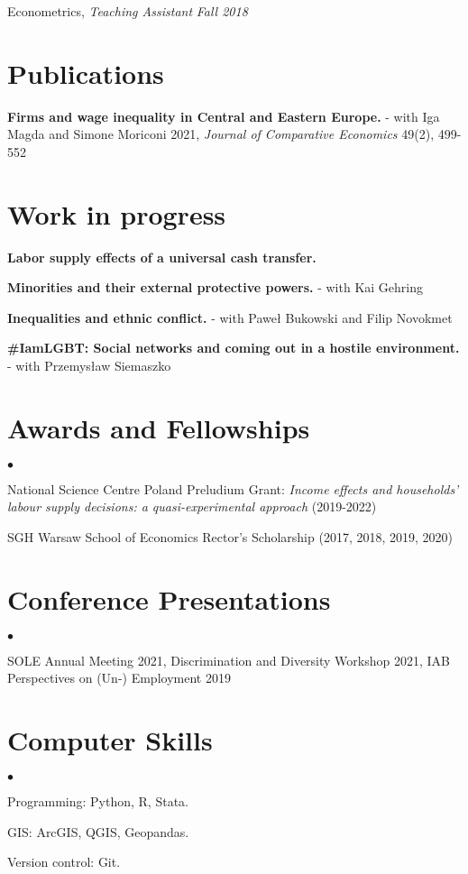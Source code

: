 \documentclass[margin,line]{res}
\newenvironment{list2}{
  \begin{list}{$\bullet$}{%
      \setlength{\itemsep}{0in}
      \setlength{\parsep}{0in} \setlength{\parskip}{0in}
      \setlength{\topsep}{0in} \setlength{\partopsep}{0in} 
      \setlength{\leftmargin}{0.2in}}}{\end{list}}
\begin{document}
\begin{resume}
\vspace{-.3cm}
Econometrics, \textit{Teaching Assistant} \hfill \textit{Fall 2018}\\
\vspace*{.05in}  

\section{\sc Publications}
\textbf{Firms and wage inequality in Central and Eastern Europe.} - with Iga Magda and Simone Moriconi 2021, \textit{Journal of Comparative Economics} 49(2), 499-552
\vspace*{.05in}  
\section{\sc Work in progress}

\textbf{Labor supply effects of a universal cash transfer. }

\textbf{Minorities and their external protective powers. } - with Kai Gehring

\textbf{Inequalities and ethnic conflict.} - with Paweł Bukowski and Filip Novokmet

\textbf{\#IamLGBT: Social networks and coming out in a hostile environment.} - with Przemysław Siemaszko
\vspace*{.05in}  
\section{\sc Awards and Fellowships} 
\begin{list2}
\item National Science Centre Poland Preludium Grant: \textit{Income effects and households' labour supply decisions: a quasi-experimental approach} (2019-2022)
\item SGH Warsaw School of Economics Rector's Scholarship (2017, 2018, 2019, 2020)
\end{list2}
\vspace*{.05in} 
\section{\sc Conference Presentations} 
\begin{list2}
	\item SOLE Annual Meeting 2021, Discrimination and Diversity Workshop 2021, IAB Perspectives on (Un-) Employment 2019 
\end{list2}
\vspace*{.05in} 
\section{\sc Computer Skills} 
\begin{list2}
\item Programming: Python, R, Stata.
\item GIS:  ArcGIS, QGIS, Geopandas.
\item Version control: Git.\\ 
\end{list2}



\end{resume}
\end{document}
